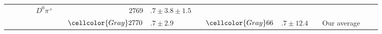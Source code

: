 \begin{adjustbox}{width=0.76\textwidth,center}
{\begin{tabular}{cp{5pt}cp{5pt}cp{5pt}r@{}lp{5pt}r@{}lp{5pt}cp{5pt}c}
		                                         &                  &                              &                  & $D^{0}\pi^{+}$                  &                       & $	2769$                       & $.7\pm3.8\pm1.5	$                             &                       & $		$                                             &                                              &                       & \babar{}                                                      &                       & \cite{delAmoSanchez:2010vq}               \\ \cmidrule{6-14}
		                                         &                  &                              &                  &                                 & \cellcolor{Gray}      & $	\cellcolor{Gray} 2770$      & \cellcolor{Gray}$.7 \pm 2.9	$                 & \cellcolor{Gray}      & $	\cellcolor{Gray} 66$                           & \cellcolor{Gray}$.7\pm12.4	$                 & \cellcolor{Gray}      & \cellcolor{Gray} Our average                                  & \cellcolor{Gray}      &                                           \\ \bottomrule
	\end{tabular}
}
\end{adjustbox}